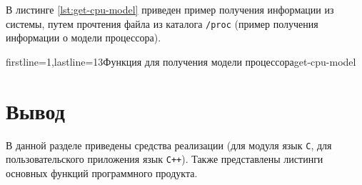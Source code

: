 В листинге \ref{lst:get-cpu-model} приведен пример получения информации из системы, путем прочтения файла из каталога \texttt{/proc} (пример получения информации о модели процессора).

    {firstline=1,lastline=13}{Функция для получения модели процессора}{get-cpu-model}{}


\section*{Вывод}

В данной разделе приведены средства реализации (для модуля язык \texttt{C}, для пользовательского приложения язык \texttt{C++}). Также представлены листинги основных функций программного продукта.
